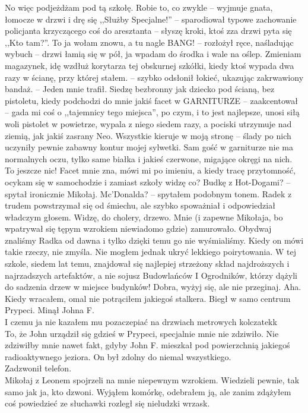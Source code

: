 \documentclass[../MAIN.tex]{subfiles}
\begin{document}
\xx No więc podjeżdżam pod tą szkołę. Robie to, co zwykle -- wyjmuje gnata, łomocze w drzwi i drę się ,,Służby Specjalne!'' -- sparodiował typowe zachowanie policjanta krzyczącego coś do aresztanta -- słyszę kroki, ktoś zza drzwi pyta się ,,Kto tam?''. To ja wołam znowu, a tu nagle BANG! -- rozłożył ręce, naśladując wybuch -- drzwi łamią się w pół, ja wpadam do środka i wale na oślep. Zmieniam magazynek, idę wzdłuż korytarza tej obskurnej szkółki, kiedy ktoś wypada dwa razy w ścianę, przy której stałem. -- szybko odsłonił łokieć, ukazując zakrwawiony bandaż. -- Jeden mnie trafił. Siedzę bezbronny jak dziecko pod ścianą, bez pistoletu, kiedy podchodzi do mnie jakiś facet w GARNITURZE -- zaakcentował -- gada mi coś o ,,tajemnicy tego miejsca'', po czym, i to jest najlepsze, unosi siłą woli pistolet w powietrze, wypala z niego siedem razy, a pociski utrzymuje nad ziemią, jak jakiś zasrany Neo. Wszystkie kieruje w moją stronę -- ślady po nich uczyniły pewnie zabawny kontur mojej sylwetki. Sam gość w garniturze
nie ma normalnych oczu, tylko same białka i jakieś czerwone, migające okręgi na nich. To jeszcze nic! Facet mnie zna, mówi mi po imieniu, a kiedy tracę przytomność, ocykam się w samochodzie i zamiast szkoły widzę co?
\xx Budkę z Hot-Dogami? -- spytał ironicznie Mikołaj.
\xx Mc’Donalda? -- spytałem podobnym tonem.
\qd
Radek z trudem powstrzymał się od śmiechu, ale szybko spoważniał i odpowiedział władczym głosem.
\sx Widzę, do cholery, drzewo. \qd
Mnie (i zapewne Mikołaja, bo wpatrywał się tępym wzrokiem niewiadomo gdzie) zamurowało. Obydwaj znaliśmy Radka od dawna i tylko dzięki temu go nie wyśmialiśmy. Kiedy on mówi takie rzeczy, nie zmyśla. Nie mogłem jednak ukryć lekkiego poirytowania.
%
\sx W tej szkole, siedem lat temu, znajdował się najlepiej strzeżony skład najdroższych i najrzadszych artefaktów, a nie sojusz Budowlańców I Ogrodników, którzy dążyli do sadzenia drzew w miejsce budynków!
\xx Dobra, wyżyj się, ale nie przeginaj. Aha. Kiedy wracałem, omal nie potrąciłem jakiegoś stalkera. Biegł w samo centrum Prypeci.
\qd
Minął Johna F.\\
I czemu ja nie kazałem mu pozaczepiać na drzwiach metrowych kolczatek\3k \\
To, że John urządził się gdzieś w Prypeci, specjalnie mnie nie zdziwiło. Nie zdziwiłby mnie nawet fakt, gdyby John F. mieszkał pod powierzchnią jakiegoś radioaktywnego jeziora. On był zdolny do niemal wszystkiego. \\
Zadzwonił telefon. \\
Mikołaj z Leonem spojrzeli na mnie niepewnym wzrokiem. Wiedzieli pewnie, tak samo jak ja, kto dzwoni. Wyjąłem komórkę, odebrałem ją, ale zanim zdążyłem coś powiedzieć ze słuchawki rozległ się nieludzki wrzask.
\end{document}
